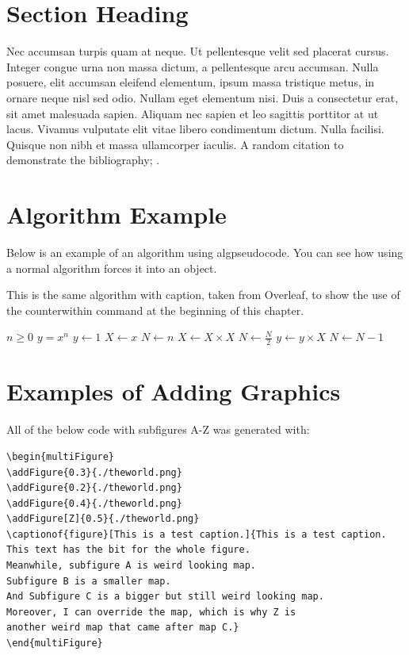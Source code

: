 \section{Section Heading}
Nec accumsan turpis quam at neque. Ut pellentesque velit sed placerat cursus. Integer congue urna non massa dictum, a pellentesque arcu accumsan. Nulla posuere, elit accumsan eleifend elementum, ipsum massa tristique metus, in ornare neque nisl sed odio. Nullam eget elementum nisi. Duis a consectetur erat, sit amet malesuada sapien. Aliquam nec sapien et leo sagittis porttitor at ut lacus. Vivamus vulputate elit vitae libero condimentum dictum. Nulla facilisi. Quisque non nibh et massa ullamcorper iaculis. A random citation to demonstrate the bibliography; \cite{ConwayCSV1}.

\section{Algorithm Example}
Below is an example of an algorithm using algpseudocode. You can see how using a normal algorithm forces it into an object. 
\begin{algorithm}
\caption[Algorithm showing counterwithin command]{This is the same algorithm with caption, taken from Overleaf, to show the use of the counterwithin command at the beginning of this chapter.}\label{alg:cap2}
\begin{algorithmic}
\Require $n \geq 0$
\Ensure $y = x^n$
\State $y \gets 1$
\State $X \gets x$
\State $N \gets n$
    \State $X \gets X \times X$
    \State $N \gets \frac{N}{2}$  
    \State $y \gets y \times X$
    \State $N \gets N - 1$
\EndIf
\EndWhile
\end{algorithmic}
\end{algorithm}


\section{Examples of Adding Graphics}
\label{Sec:addingGraphics}
All of the below code with subfigures A-Z was generated with:
\begin{verbatim}
\begin{multiFigure}
\addFigure{0.3}{./theworld.png}
\addFigure{0.2}{./theworld.png}
\addFigure{0.4}{./theworld.png}
\addFigure[Z]{0.5}{./theworld.png}
\captionof{figure}[This is a test caption.]{This is a test caption. 
This text has the bit for the whole figure. 
Meanwhile, subfigure A is weird looking map. 
Subfigure B is a smaller map. 
And Subfigure C is a bigger but still weird looking map. 
Moreover, I can override the map, which is why Z is 
another weird map that came after map C.}
\end{multiFigure}
\end{verbatim}

